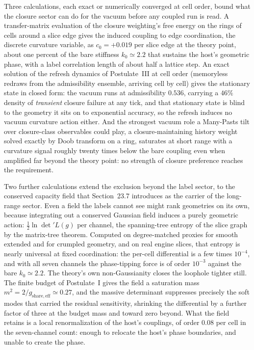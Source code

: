 \documentclass[11pt]{article}
\begin{document}
Three calculations, each exact or numerically converged at cell order, bound what the closure sector can do for the vacuum before any coupled run is read. A transfer-matrix evaluation of the closure weighting's free energy on the rings of cells around a slice edge gives the induced coupling to edge coordination, the discrete curvature variable, as $c_0=+0.019$ per slice edge at the theory point, about one percent of the bare stiffness $k_0\simeq2.2$ that sustains the host's geometric phase, with a label correlation length of about half a lattice step. An exact solution of the refresh dynamics of Postulate~III at cell order (memoryless redraws from the admissibility ensemble, arriving cell by cell) gives the stationary state in closed form: the vacuum runs at admissibility $0.536$, carrying a $46\%$ density of \emph{transient} closure failure at any tick, and that stationary state is blind to the geometry it sits on to exponential accuracy, so the refresh induces no vacuum curvature action either. And the strongest vacuum role a Many-Pasts tilt over closure-class observables could play, a closure-maintaining history weight solved exactly by Doob transform on a ring, saturates at short range with a curvature signal roughly twenty times below the bare coupling even when amplified far beyond the theory point: no strength of closure preference reaches the requirement.

Two further calculations extend the exclusion beyond the label sector, to the conserved capacity field that Section~23.7 introduces as the carrier of the long-range sector. Even a field the labels cannot see might rank geometries on its own, because integrating out a conserved Gaussian field induces a purely geometric action: $\tfrac{1}{2}\ln\det'L(g)$ per channel, the spanning-tree entropy of the slice graph by the matrix-tree theorem. Computed on degree-matched proxies for smooth extended and for crumpled geometry, and on real engine slices, that entropy is nearly universal at fixed coordination: the per-cell differential is a few times $10^{-4}$, and with all seven channels the phase-tipping force is of order $10^{-3}$ against the bare $k_0\simeq2.2$. The theory's own non-Gaussianity closes the loophole tighter still. The finite budget of Postulate~I gives the field a saturation mass $m^2=2/g_{\mathrm{share,eff}}\simeq0.27$, and the massive determinant suppresses precisely the soft modes that carried the residual sensitivity, shrinking the differential by a further factor of three at the budget mass and toward zero beyond. What the field retains is a local renormalization of the host's couplings, of order $0.08$ per cell in the seven-channel count: enough to relocate the host's phase boundaries, and unable to create the phase.
\end{document}
